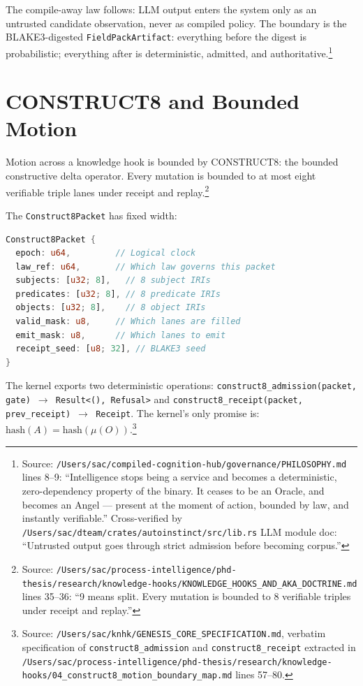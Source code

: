 The compile-away law follows: LLM output enters the system only as an untrusted candidate
observation, never as compiled policy. The boundary is the BLAKE3-digested
\texttt{FieldPackArtifact}: everything before the digest is probabilistic; everything after is
deterministic, admitted, and authoritative.\footnote{Source:
\texttt{/Users/sac/compiled-cognition-hub/governance/PHILOSOPHY.md} lines 8--9:
``Intelligence stops being a service and becomes a deterministic, zero-dependency property of
the binary. It ceases to be an Oracle, and becomes an Angel --- present at the moment of
action, bounded by law, and instantly verifiable.'' Cross-verified by
\texttt{/Users/sac/dteam/crates/autoinstinct/src/lib.rs} LLM module doc: ``Untrusted output
goes through strict admission before becoming corpus.''}

\section{CONSTRUCT8 and Bounded Motion}
\label{sec:construct8}

Motion across a knowledge hook is bounded by CONSTRUCT8: the bounded constructive delta
operator. Every mutation is bounded to at most eight verifiable triple lanes under receipt and
replay.\footnote{Source:
\texttt{/Users/sac/process-intelligence/phd-thesis/research/knowledge-hooks/KNOWLEDGE\_HOOKS\_AND\_AKA\_DOCTRINE.md}
lines 35--36: ``9 means split. Every mutation is bounded to 8 verifiable triples under receipt
and replay.''}

The \texttt{Construct8Packet} has fixed width:

\begin{lstlisting}[language=Rust,caption={Construct8Packet structure},label={lst:c8packet}]
Construct8Packet {
  epoch: u64,         // Logical clock
  law_ref: u64,       // Which law governs this packet
  subjects: [u32; 8],   // 8 subject IRIs
  predicates: [u32; 8], // 8 predicate IRIs
  objects: [u32; 8],    // 8 object IRIs
  valid_mask: u8,     // Which lanes are filled
  emit_mask: u8,      // Which lanes to emit
  receipt_seed: [u8; 32], // BLAKE3 seed
}
\end{lstlisting}

The kernel exports two deterministic operations:
\texttt{construct8\_admission(packet, gate) $\to$ Result<(), Refusal>} and
\texttt{construct8\_receipt(packet, prev\_receipt) $\to$ Receipt}. The kernel's only promise
is: $\text{hash}(A) = \text{hash}(\mu(O))$.\footnote{Source:
\texttt{/Users/sac/knhk/GENESIS\_CORE\_SPECIFICATION.md}, verbatim specification of
\texttt{construct8\_admission} and \texttt{construct8\_receipt} extracted in
\texttt{/Users/sac/process-intelligence/phd-thesis/research/knowledge-hooks/04\_construct8\_motion\_boundary\_map.md}
lines 57--80.}

